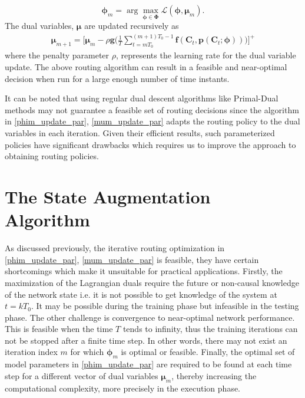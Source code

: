 \documentclass[lettersize,journal]{IEEEtran}
\begin{document}
\begin{equation} \label{phim_update_par}
    \bm{\phi}_m = \arg \max_{\bm{\phi} \in \bm{\Phi}} \mathcal{L}(\bm{\phi}, \bm{\mu}_m).
\end{equation}
The dual variables, $\bm{\mu}$ are updated recursively as 
\begin{multline} \label{mum_update_par}
    \bm{\mu}_{m+1} =  \Bigg[ \bm{\mu}_m - \rho \mathbf{g}\Biggl(\frac{1}{T} \sum_{t=mT_0}^{(m+1)T_0-1} \mathbf{f}(\mathbf{C}_t, \mathbf{p}(\mathbf{C}_t;\bm{\phi})) \Biggl) \Bigg]^+
\end{multline}
 where the penalty parameter $\rho$, represents the learning rate for the dual variable update. The above routing algorithm can result in a feasible and near-optimal decision when run for a large enough number of time instants. 


 It can be noted that using regular dual descent algorithms like Primal-Dual methods may not guarantee a feasible set of routing decisions since the algorithm in \eqref{phim_update_par}, \eqref{mum_update_par} adapts the routing policy to the dual variables in each iteration. Given their efficient results, such parameterized policies have significant drawbacks which requires us to improve the approach to obtaining routing policies.

\section{The State Augmentation Algorithm} \label{sec:state_aug}
As discussed previously, the iterative routing optimization in \eqref{phim_update_par}, \eqref{mum_update_par} is feasible, they have certain shortcomings which make it unsuitable for practical applications. Firstly, the maximization of the Lagrangian duals require the future or non-causal knowledge of the network state i.e. it is not possible to get knowledge of the system at $t=kT_0$. It may be possible during the training phase but infeasible in the testing phase. The other challenge is convergence to near-optimal network performance. This is feasible when the time $T$ tends to infinity, thus the training iterations can not be stopped after a finite time step. In other words, there may not exist an iteration index $m$ for which $\bm{\phi}_m$ is optimal or feasible. Finally, the optimal set of model parameters in \eqref{phim_update_par} are required to be found at each time step for a different vector of dual variables $\bm{\mu}_m$, thereby increasing the computational complexity, more precisely in the execution phase.
\end{document}
